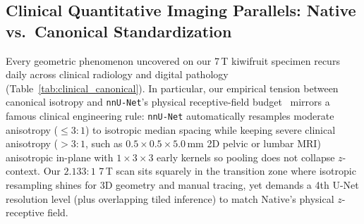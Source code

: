 \documentclass[10pt,a4paper]{article}
\renewcommand{\_}{\origunderscore\allowbreak}
\begin{document}
\subsection{Clinical Quantitative Imaging Parallels: Native vs.\ Canonical Standardization}
\label{sec:disc_clinical}

Every geometric phenomenon uncovered on our 7\,T kiwifruit specimen recurs daily across clinical radiology and digital pathology (Table~\ref{tab:clinical_canonical}). In particular, our empirical tension between canonical isotropy and \texttt{nnU-Net}'s physical receptive-field budget~\cite{isensee2021nnunet} mirrors a famous clinical engineering rule: \texttt{nnU-Net} automatically resamples moderate anisotropy ($\le 3:1$) to isotropic median spacing while keeping severe clinical anisotropy ($>3:1$, such as $0.5 \times 0.5 \times 5.0\,\text{mm}$ 2D pelvic or lumbar MRI) anisotropic in-plane with $1\times 3\times 3$ early kernels so pooling does not collapse $z$-context. Our $2.133:1$ 7\,T scan sits squarely in the transition zone where isotropic resampling shines for 3D geometry and manual tracing, yet demands a 4th U-Net resolution level (plus overlapping tiled inference) to match Native's physical $z$-receptive field.
\end{document}
